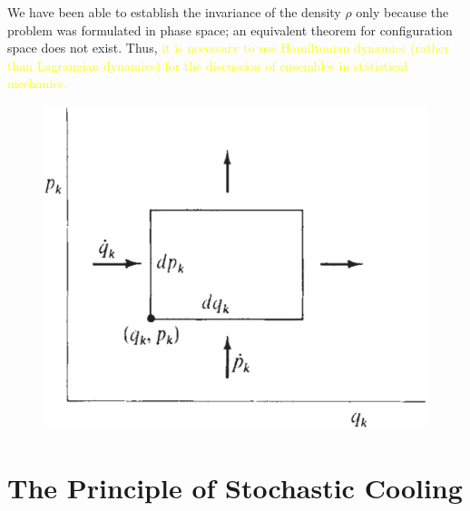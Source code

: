 \documentclass[11pt,a4paper]{article}
\newcounter{theo}[section]\setcounter{theo}{0}
\begin{document}
We have been able to establish the invariance of the density $\rho$ only because the problem was formulated in phase space; an equivalent theorem for configuration space does not exist. Thus, \textcolor{yellow}{it is necessary to use Hamiltonian dynamics (rather than Lagrangian dynamics) for the discussion of ensembles in statistical mechanics.}

\begin{figure}
\centering
\includegraphics[height=8.cm,angle=0]{representative_points.eps}
\caption{
} 
\label{fig:representative_points}
\end{figure}



\cite{2002clme.book.....G}

\section{The Principle of Stochastic Cooling}
\cite{greiner2009classical} 
\end{document}
